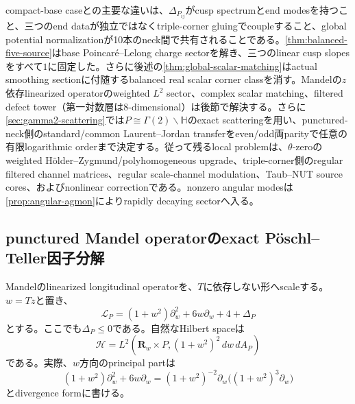 \documentclass[11pt,a4paper]{ltjsarticle}
\theoremstyle{definition}
\theoremstyle{remark}
\newcommand{\RR}{\mathbf R}
\begin{document}
compact-base caseとの主要な違いは、$\Delta_{P_{ij}}$がcusp spectrumとend modesを持つこと、三つのend dataが独立ではなくtriple-corner gluingでcoupleすること、global potential normalizationが10本のneck間で共有されることである。\cref{thm:balanced-five-source}はbase Poincar\'e--Lelong charge sectorを解き、三つのlinear cusp slopesをすべて$1$に固定した。さらに後述の\cref{thm:global-scalar-matching}はactual smoothing sectionに付随するbalanced real scalar corner classを消す。Mandelの$z$依存linearized operatorのweighted $L^2$ sector、complex scalar matching、filtered defect tower（第一対数層は8-dimensional）は後節で解決する。さらに\cref{sec:gamma2-scattering}では$P\cong\Gamma(2)\backslash\mathbb H$のexact scatteringを用い、punctured-neck側のstandard/common Laurent--Jordan transferをeven/odd両parityで任意の有限logarithmic orderまで決定する。従って残るlocal problemは、$\theta$-zeroのweighted Hölder--Zygmund/polyhomogeneous upgrade、triple-corner側のregular filtered channel matrices、regular scale-channel modulation、Taub--NUT source cores、およびnonlinear correctionである。nonzero angular modesは\cref{prop:angular-agmon}によりrapidly decaying sectorへ入る。

\subsection{punctured Mandel operatorのexact Pöschl--Teller因子分解}
\label{subsec:mandel-factorization}

Mandelのlinearized longitudinal operatorを、$T$に依存しない形へscaleする。$w=Tz$と置き、
\begin{equation}\label{eq:scaled-mandel-operator}
 \mathscr L_P
 =(1+w^2)\partial_w^2+6w\partial_w+4+\Delta_P
\end{equation}
とする。ここでも$\Delta_P\le0$である。自然なHilbert spaceは
\begin{equation}\label{eq:mandel-weighted-Hilbert}
 \mathscr H
 =L^2\!\left(\RR_w\times P,
 (1+w^2)^2\,dw\,dA_P\right)
\end{equation}
である。実際、$w$方向のprincipal partは
\[
 (1+w^2)\partial_w^2+6w\partial_w
 =(1+w^2)^{-2}\partial_w\bigl((1+w^2)^3\partial_w\bigr)
\]
とdivergence formに書ける。
\end{document}
